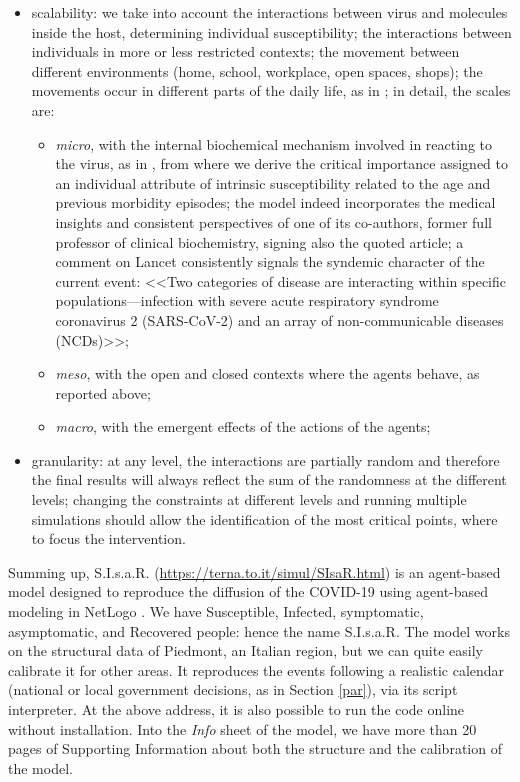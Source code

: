 \documentclass[graybox]{svmult}
\begin{document}
\begin{itemize}

\item
scalability: we take into account the interactions between virus and molecules inside the host, determining individual susceptibility; the interactions between individuals in more or less restricted contexts; the movement between different environments (home, school, workplace, open spaces, shops); the movements occur in different parts of the daily life, as in \cite{ghorbani2020assocc};
in detail, the scales are: 

\begin{itemize}
\item
	\emph{micro}, with the internal biochemical mechanism involved in reacting to the virus, as in \cite{Silvagno_2020}, from where we derive the critical importance assigned to an individual attribute of intrinsic susceptibility related to the age and previous morbidity episodes; the model indeed incorporates the medical insights and consistent perspectives of one of its co-authors, former full professor of clinical biochemistry, signing also the quoted article; a comment on Lancet \cite{horton2020offline} consistently signals the syndemic character of the current event: <<Two categories of disease are interacting within specific populations---infection with severe acute respiratory syndrome coronavirus 2 (SARS-CoV-2) and an array of non-communicable diseases (NCDs)>>;
\item
	\emph{meso}, with the open and closed contexts where the agents behave, as reported above;
\item	
	\emph{macro}, with the emergent effects of the actions of the agents;
	
\end{itemize}

\item
granularity: at any level, the interactions are partially random and therefore the final results will always reflect the sum of the randomness at the different levels; changing the constraints at different levels and running multiple simulations should allow the identification of the most critical points, where to focus the intervention.

\end{itemize}

Summing up, S.I.s.a.R. (\href{https://terna.to.it/simul/SIsaR.html}{https://terna.to.it/simul/SIsaR.html}) is an agent-based model designed to reproduce the diffusion of the COVID-19 using agent-based modeling in NetLogo \cite{NetLogo}. We have Susceptible, Infected, symptomatic, asymptomatic, and Recovered people: hence the name S.I.s.a.R. The model works on the structural data of Piedmont, an Italian region, but we can quite easily calibrate it for other areas. It reproduces the events following a realistic calendar (national or local government decisions, as in Section \ref{par}), via its script interpreter. At the above address, it is also possible to run the code online without installation. Into the \emph{Info} sheet of the model, we have more than 20 pages of Supporting Information about both the structure and the calibration of the model.
\end{document}
